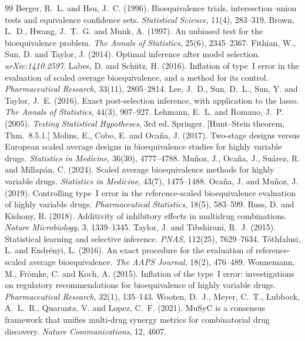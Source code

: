 \documentclass[11pt]{article}
\theoremstyle{remark}
\begin{document}
\begin{thebibliography}{99}
 Berger, R.~L. and Hsu, J.~C. (1996). Bioequivalence trials, intersection--union tests and equivalence confidence sets. \emph{Statistical Science}, 11(4), 283--319.
 Brown, L.~D., Hwang, J.~T.~G. and Munk, A. (1997). An unbiased test for the bioequivalence problem. \emph{The Annals of Statistics}, 25(6), 2345--2367.
 Fithian, W., Sun, D. and Taylor, J. (2014). Optimal inference after model selection. \emph{arXiv:1410.2597}.
 Labes, D. and Sch\"utz, H. (2016). Inflation of type~I error in the evaluation of scaled average bioequivalence, and a method for its control. \emph{Pharmaceutical Research}, 33(11), 2805--2814.
 Lee, J.~D., Sun, D.~L., Sun, Y. and Taylor, J.~E. (2016). Exact post-selection inference, with application to the lasso. \emph{The Annals of Statistics}, 44(3), 907--927.
 Lehmann, E.~L. and Romano, J.~P. (2005). \emph{Testing Statistical Hypotheses}, 3rd ed. Springer. [Hunt--Stein theorem, Thm.~8.5.1.]
 Molins, E., Cobo, E. and Oca\~na, J. (2017). Two-stage designs versus European scaled average designs in bioequivalence studies for highly variable drugs. \emph{Statistics in Medicine}, 36(30), 4777--4788.
 Mu\~noz, J., Oca\~na, J., Su\'arez, R. and Millap\'an, C. (2024). Scaled average bioequivalence methods for highly variable drugs. \emph{Statistics in Medicine}, 43(7), 1475--1488.
 Oca\~na, J. and Mu\~noz, J. (2019). Controlling type~I error in the reference-scaled bioequivalence evaluation of highly variable drugs. \emph{Pharmaceutical Statistics}, 18(5), 583--599.
 Russ, D. and Kishony, R. (2018). Additivity of inhibitory effects in multidrug combinations. \emph{Nature Microbiology}, 3, 1339--1345.
 Taylor, J. and Tibshirani, R.~J. (2015). Statistical learning and selective inference. \emph{PNAS}, 112(25), 7629--7634.
 T\'othfalusi, L. and Endr\'enyi, L. (2016). An exact procedure for the evaluation of reference-scaled average bioequivalence. \emph{The AAPS Journal}, 18(2), 476--489.
 Wonnemann, M., Fr\"omke, C. and Koch, A. (2015). Inflation of the type~I error: investigations on regulatory recommendations for bioequivalence of highly variable drugs. \emph{Pharmaceutical Research}, 32(1), 135--143.
 Wooten, D.~J., Meyer, C.~T., Lubbock, A.~L.~R., Quaranta, V. and Lopez, C.~F. (2021). MuSyC is a consensus framework that unifies multi-drug synergy metrics for combinatorial drug discovery. \emph{Nature Communications}, 12, 4607.
\end{thebibliography}
\end{document}
